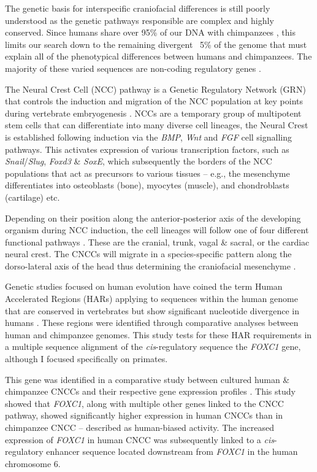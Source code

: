 \documentclass{article}[12pt]
\begin{document}
The genetic basis for interspecific craniofacial differences is still poorly understood as the genetic pathways responsible are complex and highly conserved. Since humans share over 95\% of our DNA with chimpanzees \parencite{Suntsova2020, Varki2005}, this limits our search down to the remaining divergent ~5\% of the genome that must explain all of the phenotypical differences between humans and chimpanzees. The majority of these varied sequences are non-coding regulatory genes \parencite{Franchini2017}.

The Neural Crest Cell (\Gls{NCC}) pathway is a Genetic Regulatory Network (\Gls{GRN}) that controls the induction and migration of the NCC population at key points during vertebrate embryogenesis \parencite{Huang2004, Li2009}. \Glspl{NCC} are a temporary group of multipotent stem cells that can differentiate into many diverse cell lineages, the Neural Crest is established following induction via the \emph{BMP}, \emph{Wnt} and \emph{FGF} cell signalling pathways. This activates expression of various transcription factors, such as \emph{Snail}/\emph{Slug}, \emph{Foxd3} \& \emph{SoxE}, which subsequently the borders of the NCC populations that act as precursors to various tissues – e.g., the mesenchyme differentiates into osteoblasts (bone), myocytes (muscle), and chondroblasts (cartilage) etc. \parencite{Huang2004, Kulesa2010}

Depending on their position along the anterior-posterior axis of the developing organism during \Gls{NCC} induction, the cell lineages will follow one of four different functional pathways \parencite{Huang2004}. These are the cranial, trunk, vagal \& sacral, or the cardiac neural crest. The \Glspl{CNCC} will migrate in a species-specific pattern along the dorso-lateral axis of the head thus determining the craniofacial mesenchyme \parencite{Kulesa2010, Bronner2012, deLeon2007}.

Genetic studies focused on human evolution have coined the term Human Accelerated Regions (HARs) applying to sequences within the human genome that are conserved in vertebrates but show significant nucleotide divergence in humans \parencite{Gittelman2015, Bird2007, Hubisz2014}. These regions were identified through comparative analyses between human and chimpanzee genomes. This study tests for these \Gls{HAR} requirements in a multiple sequence alignment of the \emph{cis}-regulatory sequence the \emph{\Gls{FOXC1}} gene, although I focused specifically on primates.

This gene was identified in a comparative study between cultured human \& chimpanzee \Glspl{CNCC} and their respective gene expression profiles \parencite{Prescott2015}. This study showed that \emph{FOXC1}, along with multiple other genes linked to the CNCC pathway, showed significantly higher expression in human CNCCs than in chimpanzee CNCC – described as human-biased activity. The increased expression of \emph{FOXC1} in human CNCC was subsequently linked to a \emph{cis}-regulatory enhancer sequence located downstream from \emph{FOXC1} in the human chromosome 6.
\end{document}
